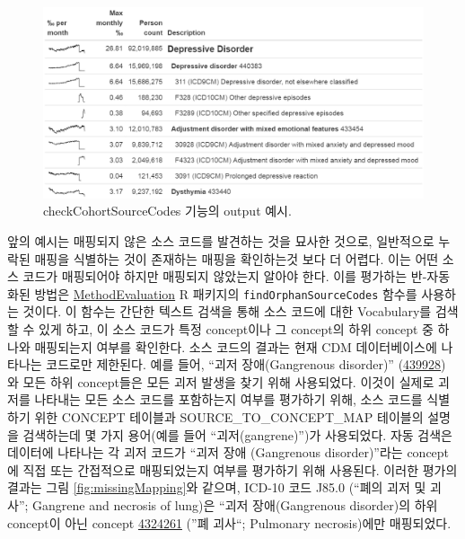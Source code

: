 \documentclass[11pt]{book}
\theoremstyle{definition}
\theoremstyle{definition}
\theoremstyle{definition}
\theoremstyle{remark}
\begin{document}
\begin{figure}

{\centering \includegraphics[width=1\linewidth]{images/DataQuality/sourceCodes} 

}

\caption{checkCohortSourceCodes 기능의 output 예시. }\label{fig:sourceCodes}
\end{figure}

앞의 예시는 매핑되지 않은 소스 코드를 발견하는 것을 묘사한 것으로,
일반적으로 누락된 매핑을 식별하는 것이 존재하는 매핑을 확인하는것 보다
더 어렵다. 이는 어떤 소스 코드가 매핑되어야 하지만 매핑되지 않았는지
알아야 한다. 이를 평가하는 반-자동화된 방법은
\href{https://ohdsi.github.io/MethodEvaluation/}{MethodEvaluation} R
패키지의 \texttt{findOrphanSourceCodes} 함수를 사용하는 것이다. 이
함수는 간단한 텍스트 검색을 통해 소스 코드에 대한 Vocabulary를 검색할 수
있게 하고, 이 소스 코드가 특정 concept이나 그 concept의 하위 concept 중
하나와 매핑되는지 여부를 확인한다. 소스 코드의 결과는 현재 CDM
데이터베이스에 나타나는 코드로만 제한된다. 예를 들어, ``괴저
장애(Gangrenous disorder)''
(\href{http://athena.ohdsi.org/search-terms/terms/439928}{439928}) 와
모든 하위 concept들은 모든 괴저 발생을 찾기 위해 사용되었다. 이것이
실제로 괴저를 나타내는 모든 소스 코드를 포함하는지 여부를 평가하기 위해,
소스 코드를 식별하기 위한 CONCEPT 테이블과 SOURCE\_TO\_CONCEPT\_MAP
테이블의 설명을 검색하는데 몇 가지 용어(예를 들어 ``괴저(gangrene)'')가
사용되었다. 자동 검색은 데이터에 나타나는 각 괴저 코드가 ``괴저 장애
(Gangrenous disorder)''라는 concept에 직접 또는 간접적으로 매핑되었는지
여부를 평가하기 위해 사용된다. 이러한 평가의 결과는 그림
\ref{fig:missingMapping}와 같으며, ICD-10 코드 J85.0 (``폐의 괴저 및
괴사''; Gangrene and necrosis of lung)은 ``괴저 장애(Gangrenous
disorder)의 하위 concept이 아닌 concept
\href{http://athena.ohdsi.org/search-terms/terms/4324261}{4324261} (''폐
괴사``; Pulmonary necrosis)에만 매핑되었다. 
\end{document}

